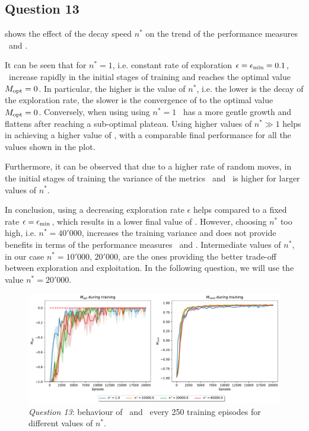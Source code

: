 \documentclass[10pt]{IEEEtran}
\begin{document}
\subsection*{Question 13}
 shows the effect of the decay speed $n^{*}$ on the trend of the performance measures \mopt\  and \mrand. 

It can be seen that for $n^* = 1$, i.e. constant rate of exploration $\epsilon = \epsilon_{\text{min}} = 0.1$, \mopt\ increase rapidly in the initial stages of training and reaches the optimal value $M_{\text{opt}} = 0$. In particular, the higher is the value of $n^*$, i.e. the lower is the decay of the exploration rate, the slower is the convergence of \mopt to the optimal value  $M_{\text{opt}} = 0$. Conversely, when using  using $n^* = 1$ \mrand\ has a more gentle growth and flattens after reaching a sub-optimal plateau. Using higher values of $n^* \gg 1$ helps in achieving a higher value of \mrand, with a comparable final performance for all the values shown in the plot.

Furthermore, it can be observed that due to a higher rate of random moves, in the initial stages of training the variance of the metrics \mopt\ and \mrand\ is higher for larger values of $n^*$.

In conclusion, using a decreasing exploration rate $\epsilon$ helps compared to a fixed rate $\epsilon = \epsilon_{\text{min}}$, which results in a lower final value of \mrand. However, choosing $n^*$ too high, i.e. $n^* = 40'000$, increases the training variance and does not provide benefits in terms of the performance measures \mopt\ and \mrand. Intermediate values of $n^*$, in our case $n^*=10'000,\,20'000$, are the ones providing the better trade-off between exploration and exploitation. In the following question, we will use the value $n^* = 20'000$. 

\begin{figure}[h]
    \centering
    \includegraphics[width = \linewidth]{code/figures/performance_dqn_n_star.pdf}
    \caption{\emph{Question 13}: behaviour of \mopt\  and \mrand\  every 250 training episodes for different values of $n^{*}$.}
    \label{plot_question13}
\end{figure}
\end{document}
